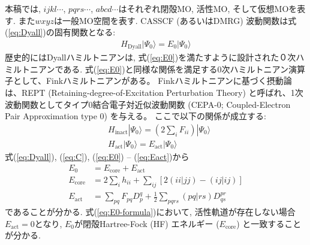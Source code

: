 \documentclass[11pt,pra,aps]{revtex4}
\begin{document}
%
本稿では, $ijkl\cdots$, $pqrs\cdots$, $abcd\cdots$はそれぞれ閉殻MO, 活性MO, そして仮想MOを表す. また$wxyz$は一般MO空間を表す. 
%
%
CASSCF (あるいはDMRG) 波動関数は式(\ref{eq:Dyall})の固有関数となる:
%
\begin{align}
  H_\text{Dyall}|\Psi_0\rangle = E_0|\Psi_0\rangle \label{eq:E0}
\end{align}
%
歴史的にはDyallハミルトニアンは, 式(\ref{eq:E0})を満たすように設計された０次ハミルトニアンである. 式(\ref{eq:E0})と同様な関係を満足する0次ハミルトニアン演算子として、Finkハミルトニアンがある。\cite{FINK2006461,FINK200939} Finkハミルトニアンに基づく摂動論は、REPT (Retaining-degree-of-Excitation Perturbation Theory) と呼ばれ、1次波動関数としてタイプ0結合電子対近似波動関数 (CEPA-0; Coupled-Electron Pair Approximation type 0) を与える。\cite{doi:10.1063/1.5086168,doi:10.1021/acs.jctc.8b01301}
ここで以下の関係が成立する:
%
\begin{align}
  & H_\text{inact}|\Psi_0\rangle = \left(2\sum_i F_{ii}\right)|\Psi_0\rangle \label{eq:Einact}\\
  & H_\text{act}|\Psi_0\rangle = E_\text{act}|\Psi_0\rangle \label{eq:Eact}
\end{align}
%
式(\ref{eq:Dyall}), (\ref{eq:C}), (\ref{eq:E0}) -- (\ref{eq:Eact})から
%
\begin{align}
  E_0 &= E_\text{core} + E_\text{act} \label{eq:E0-formula} \\
  E_\text{core} &= 2\sum_i h_{ii} + \sum_{ij} [2(ii|jj)-(ij|ij)] \label{eq:E0-formula-Ecore} \\
  E_\text{act} &= \sum_{pq} F_{pq} D_p^q + \frac{1}{2}\sum_{pqrs} (pq|rs) D^{pr}_{qs}\label{eq:E0-formula-Eact}  
\end{align}
%
であることが分かる. 式(\ref{eq:E0-formula})において, 活性軌道が存在しない場合$E_\text{act}=0$となり, $E_0$が閉殻Hartree-Fock (HF) エネルギー ($E_\text{core}$) と一致することが分かる. 
\end{document}
